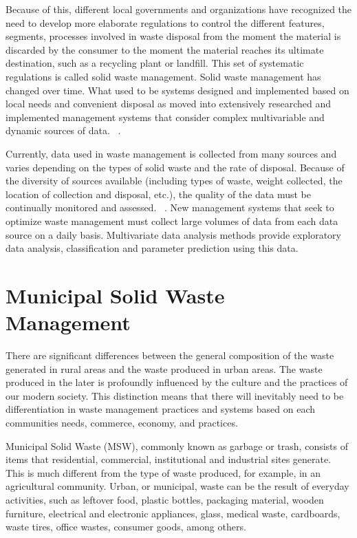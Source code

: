 \documentclass[sigconf]{acmart}
\begin{document}
Because of this, different local governments and organizations have recognized the need to develop more elaborate regulations to control the different features, segments, processes involved in waste disposal from the moment the material is discarded by the consumer to the moment the material reaches its ultimate destination, such as a recycling plant or landfill. This set of systematic regulations is called solid waste management. Solid waste management has changed over time.  What used to be systems designed and implemented based on local needs and convenient disposal as moved into extensively researched and implemented management systems that consider complex multivariable and dynamic sources of data. ~\cite{akbarpour2016}.

Currently, data used in waste management is collected from many sources and varies depending on the types of solid waste and the rate of disposal. Because of the diversity of sources available (including types of waste, weight collected, the location of collection and disposal, etc.), the quality of the data must be continually monitored and assessed. ~\cite{chandrappa2012}. New management systems that seek to optimize waste management must collect large volumes of data from each data source on a daily basis. Multivariate data analysis methods provide exploratory data analysis, classification and parameter prediction using this data. ~\cite{bohm2013} 

\section{ Municipal Solid Waste Management}

There are significant differences between the general composition of the waste generated in rural areas and the waste produced in urban areas. The waste produced in the later is profoundly influenced by the culture and the practices of our modern society.  This distinction means that there will inevitably need to be differentiation in waste management practices and systems based on each communities needs, commerce, economy, and practices.  ~\cite{chandrappa2012}

Municipal Solid Waste (MSW), commonly known as garbage or trash, consists of items that residential, commercial, institutional and industrial sites generate. This is much different from the type of waste produced, for example, in an agricultural community.  Urban, or municipal, waste can be the result of everyday activities, such as leftover food, plastic bottles, packaging material, wooden furniture, electrical and electronic appliances, glass, medical waste, cardboards, waste tires, office wastes, consumer goods, among others. 
\end{document}
